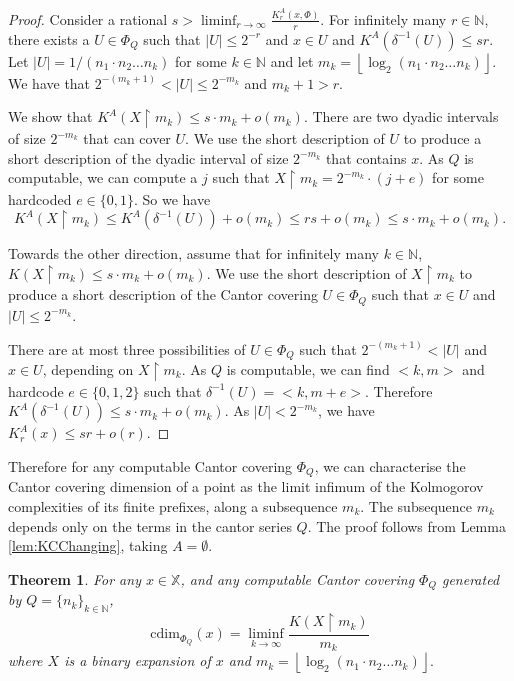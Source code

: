 \documentclass[11pt]{article}
\newtheorem{theorem}{Theorem}
\newcommand{\floor}[1]{ \left\lfloor #1 \right\rfloor }
\newcommand{\restr}{\upharpoonright}
\newcommand{\N}{\mathbb{N}}
\newcommand{\cdim}{\mathrm{cdim}}
\newcommand{\X}{{\mathbb{X}}}
\newcommand{\U}{U}
\newcommand{\x}{x}
\begin{document}
\begin{proof}
	
	Consider a rational $s > \liminf_{r \rightarrow \infty} \frac{K_r^A(\x, \Phi)}{r}$. For infinitely many $r \in \N$, there exists a $U \in \Phi_Q$ such that $|U| \leq 2^{-r}$ and $x \in \U$ and $K^A(\delta^{-1}(U)) \leq sr$. Let $|U| = 1/(n_1 \cdot n_2 \dots n_k)$ for some $k \in \N$ and let $m_k = \floor{\log_2(n_1 \cdot n_2 \dots
		n_k)}$. We have that $2^{-(m_k+1)} < |U| \leq 2^{-m_k}$ and $m_k+1 > r$.
	
	We show that $K^A(X \restr m_k) \leq s\cdot m_k + o(m_k)$.  There are two dyadic intervals of size $2^{-m_k}$  that can cover $U$. We use the short description of $U$ to produce a short description of the dyadic interval of size $2^{-m_k}$ that contains $x$.  As $Q$ is computable, we can compute a $j$ such that $X \restr m_k = {2^{-m_k}} \cdot ({j+e})$ for some hardcoded $e \in \{0,1\}$. So we have
 $$K^A(X \restr m_k) \leq K^A(\delta^{-1}(U)) + o(m_k) \leq rs + o(m_k) \leq s\cdot m_k + o(m_k).$$ 
	
	Towards the other direction, assume that for infinitely many $k \in \N$, $K(X \restr m_k) \leq s\cdot m_k + o(m_k)$. We use the short description of $X \restr m_k$ to produce a short description of the Cantor covering $U \in \Phi_Q$ such that $x \in U$ and $|U| \leq 2^{-m_k}$. 
	
	There are at most three possibilities of $U \in \Phi_Q$ such that $2^{-(m_k+1)} < |U|$ and $x \in \U$, depending on $X \restr m_k$. As $Q$ is computable, we can find $<k,m>$ and hardcode $e \in \{0,1,2\}$ such that $\delta^{-1}(U) = <k,m+e>$.
	Therefore $K^A(\delta^{-1}(U)) \leq s\cdot m_k + o(m_k)$. As $|U| < 2^{-m_k}$, we have $K_r^A(x) \leq sr + o(r)$.
\end{proof}

Therefore for any computable Cantor covering $\Phi_Q$, we can characterise the Cantor covering dimension of a point as the limit infimum of the Kolmogorov complexities of its finite prefixes, along a subsequence $m_k$. The subsequence $m_k$ depends only on the terms in the cantor series $Q$. The proof follows from Lemma \ref{lem:KCChanging}, taking $A = \emptyset$.
\begin{theorem}\label{lem:KCCharnofPhidim}
	For any $x \in \X$, and any computable Cantor covering $\Phi_Q$
	generated by $Q = \{n_k\}_{k \in \N}$,
	$$\cdim_{\Phi_Q}(x) = \liminf\limits_{k\to\infty} \frac{K(X
		\restr m_k)}{m_k}$$ where $X$ is a binary
	expansion of $x$ and $m_k = \floor{\log_2(n_1 \cdot n_2 \dots
		n_k)}.$
\end{theorem}
\end{document}
